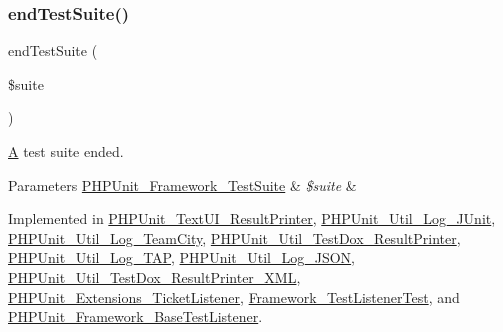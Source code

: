 \subsubsection{\texorpdfstring{end\+Test\+Suite()}{endTestSuite()}}
{\footnotesize\ttfamily end\+Test\+Suite (\begin{DoxyParamCaption}\item[{\mbox{\hyperlink{class_p_h_p_unit___framework___test_suite}{P\+H\+P\+Unit\+\_\+\+Framework\+\_\+\+Test\+Suite}}}]{\$suite }\end{DoxyParamCaption})}

\mbox{\hyperlink{class_a}{A}} test suite ended.


\begin{DoxyParams}[1]{Parameters}
\mbox{\hyperlink{class_p_h_p_unit___framework___test_suite}{P\+H\+P\+Unit\+\_\+\+Framework\+\_\+\+Test\+Suite}} & {\em \$suite} & \\
\hline
\end{DoxyParams}


Implemented in \mbox{\hyperlink{class_p_h_p_unit___text_u_i___result_printer_aeec28a4d1328434916ebcdc1ca6b5527}{P\+H\+P\+Unit\+\_\+\+Text\+U\+I\+\_\+\+Result\+Printer}}, \mbox{\hyperlink{class_p_h_p_unit___util___log___j_unit_aeec28a4d1328434916ebcdc1ca6b5527}{P\+H\+P\+Unit\+\_\+\+Util\+\_\+\+Log\+\_\+\+J\+Unit}}, \mbox{\hyperlink{class_p_h_p_unit___util___log___team_city_aeec28a4d1328434916ebcdc1ca6b5527}{P\+H\+P\+Unit\+\_\+\+Util\+\_\+\+Log\+\_\+\+Team\+City}}, \mbox{\hyperlink{class_p_h_p_unit___util___test_dox___result_printer_aeec28a4d1328434916ebcdc1ca6b5527}{P\+H\+P\+Unit\+\_\+\+Util\+\_\+\+Test\+Dox\+\_\+\+Result\+Printer}}, \mbox{\hyperlink{class_p_h_p_unit___util___log___t_a_p_aeec28a4d1328434916ebcdc1ca6b5527}{P\+H\+P\+Unit\+\_\+\+Util\+\_\+\+Log\+\_\+\+T\+AP}}, \mbox{\hyperlink{class_p_h_p_unit___util___log___j_s_o_n_aeec28a4d1328434916ebcdc1ca6b5527}{P\+H\+P\+Unit\+\_\+\+Util\+\_\+\+Log\+\_\+\+J\+S\+ON}}, \mbox{\hyperlink{class_p_h_p_unit___util___test_dox___result_printer___x_m_l_aeec28a4d1328434916ebcdc1ca6b5527}{P\+H\+P\+Unit\+\_\+\+Util\+\_\+\+Test\+Dox\+\_\+\+Result\+Printer\+\_\+\+X\+ML}}, \mbox{\hyperlink{class_p_h_p_unit___extensions___ticket_listener_aeec28a4d1328434916ebcdc1ca6b5527}{P\+H\+P\+Unit\+\_\+\+Extensions\+\_\+\+Ticket\+Listener}}, \mbox{\hyperlink{class_framework___test_listener_test_aeec28a4d1328434916ebcdc1ca6b5527}{Framework\+\_\+\+Test\+Listener\+Test}}, and \mbox{\hyperlink{class_p_h_p_unit___framework___base_test_listener_aeec28a4d1328434916ebcdc1ca6b5527}{P\+H\+P\+Unit\+\_\+\+Framework\+\_\+\+Base\+Test\+Listener}}.

